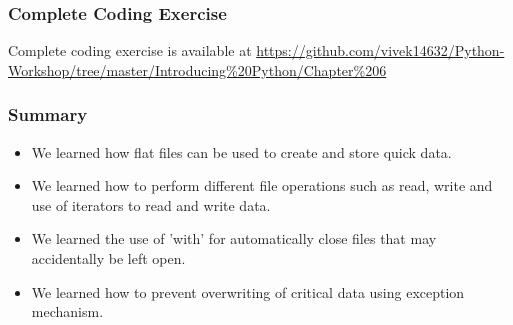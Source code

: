 \documentclass{beamer}
\begin{document}
\begin{frame}
\frametitle{Complete Coding Exercise}
Complete coding exercise is available at \url{https://github.com/vivek14632/Python-Workshop/tree/master/Introducing\%20Python/Chapter\%206}
\end{frame}

\begin{frame}
\frametitle{Summary}
\begin{itemize}
\item We learned how flat files can be used to create and store quick data.
\item We learned how to perform different file operations such as read, write and use of iterators to read and write data.
\item We learned the use of 'with' for automatically close files that may accidentally be left open.
\item We learned how to prevent overwriting of critical data using exception mechanism.
\end{itemize}
\end{frame}
\end{document}

